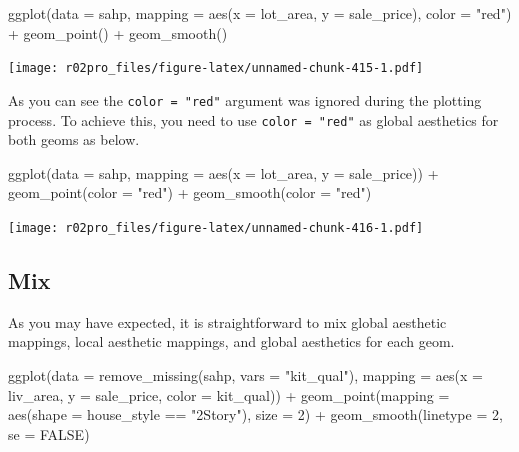 \documentclass[
]{book}
\newenvironment{Shaded}{\begin{snugshade}}{\end{snugshade}}
\newcommand{\AttributeTok}[1]{\textcolor[rgb]{0.77,0.63,0.00}{#1}}
\newcommand{\ConstantTok}[1]{\textcolor[rgb]{0.00,0.00,0.00}{#1}}
\newcommand{\DecValTok}[1]{\textcolor[rgb]{0.00,0.00,0.81}{#1}}
\newcommand{\FunctionTok}[1]{\textcolor[rgb]{0.00,0.00,0.00}{#1}}
\newcommand{\NormalTok}[1]{#1}
\newcommand{\SpecialCharTok}[1]{\textcolor[rgb]{0.00,0.00,0.00}{#1}}
\newcommand{\StringTok}[1]{\textcolor[rgb]{0.31,0.60,0.02}{#1}}
\begin{document}
\begin{Shaded}
\begin{Highlighting}[]
\FunctionTok{ggplot}\NormalTok{(}\AttributeTok{data =}\NormalTok{ sahp, }\AttributeTok{mapping =} \FunctionTok{aes}\NormalTok{(}\AttributeTok{x =}\NormalTok{ lot\_area, }\AttributeTok{y =}\NormalTok{ sale\_price), }\AttributeTok{color =} \StringTok{"red"}\NormalTok{) }\SpecialCharTok{+} \FunctionTok{geom\_point}\NormalTok{() }\SpecialCharTok{+} \FunctionTok{geom\_smooth}\NormalTok{()}
\end{Highlighting}
\end{Shaded}

\texttt{[image: r02pro\_files/figure-latex/unnamed-chunk-415-1.pdf]}

As you can see the \texttt{color\ =\ "red"} argument was ignored during the plotting process. To achieve this, you need to use \texttt{color\ =\ "red"} as global aesthetics for both geoms as below.

\begin{Shaded}
\begin{Highlighting}[]
\FunctionTok{ggplot}\NormalTok{(}\AttributeTok{data =}\NormalTok{ sahp, }\AttributeTok{mapping =} \FunctionTok{aes}\NormalTok{(}\AttributeTok{x =}\NormalTok{ lot\_area, }\AttributeTok{y =}\NormalTok{ sale\_price)) }\SpecialCharTok{+} \FunctionTok{geom\_point}\NormalTok{(}\AttributeTok{color =} \StringTok{"red"}\NormalTok{) }\SpecialCharTok{+} \FunctionTok{geom\_smooth}\NormalTok{(}\AttributeTok{color =} \StringTok{"red"}\NormalTok{)}
\end{Highlighting}
\end{Shaded}

\texttt{[image: r02pro\_files/figure-latex/unnamed-chunk-416-1.pdf]}

\hypertarget{mix}{%
\subsection{Mix}\label{mix}}

As you may have expected, it is straightforward to mix global aesthetic mappings, local aesthetic mappings, and global aesthetics for each geom.

\begin{Shaded}
\begin{Highlighting}[]
\FunctionTok{ggplot}\NormalTok{(}\AttributeTok{data =} \FunctionTok{remove\_missing}\NormalTok{(sahp, }\AttributeTok{vars =} \StringTok{"kit\_qual"}\NormalTok{), }\AttributeTok{mapping =} \FunctionTok{aes}\NormalTok{(}\AttributeTok{x =}\NormalTok{ liv\_area, }\AttributeTok{y =}\NormalTok{ sale\_price, }\AttributeTok{color =}\NormalTok{ kit\_qual)) }\SpecialCharTok{+} \FunctionTok{geom\_point}\NormalTok{(}\AttributeTok{mapping =} \FunctionTok{aes}\NormalTok{(}\AttributeTok{shape =}\NormalTok{ house\_style }\SpecialCharTok{==} \StringTok{"2Story"}\NormalTok{), }\AttributeTok{size =} \DecValTok{2}\NormalTok{) }\SpecialCharTok{+} \FunctionTok{geom\_smooth}\NormalTok{(}\AttributeTok{linetype =} \DecValTok{2}\NormalTok{, }\AttributeTok{se =} \ConstantTok{FALSE}\NormalTok{)}
\end{Highlighting}
\end{Shaded}
\end{document}
